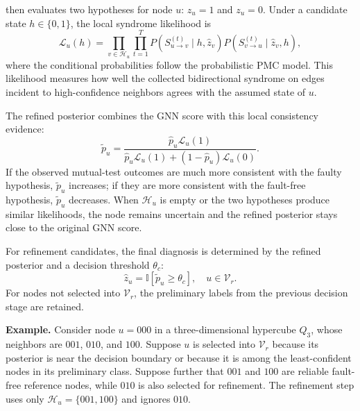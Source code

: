 \tool then evaluates two hypotheses for node $u$: $z_u=1$ and $z_u=0$. Under a candidate state $h\in\{0,1\}$, the local syndrome likelihood is
\begin{equation*}
\mathcal{L}_u(h)=
\prod_{v\in\mathcal{H}_u}\prod_{t=1}^{T}
P(S_{u\rightarrow v}^{(t)}\mid h,\hat{z}_v)
P(S_{v\rightarrow u}^{(t)}\mid \hat{z}_v,h),
\end{equation*}
where the conditional probabilities follow the probabilistic PMC model. This likelihood measures how well the collected bidirectional syndrome on edges incident to high-confidence neighbors agrees with the assumed state of $u$.

The refined posterior combines the GNN score with this local consistency evidence:
\begin{equation*}
\tilde{p}_u=
\frac{\hat{p}_u\mathcal{L}_u(1)}
{\hat{p}_u\mathcal{L}_u(1)+(1-\hat{p}_u)\mathcal{L}_u(0)}.
\end{equation*}
If the observed mutual-test outcomes are much more consistent with the faulty hypothesis, $\tilde{p}_u$ increases; if they are more consistent with the fault-free hypothesis, $\tilde{p}_u$ decreases. When $\mathcal{H}_u$ is empty or the two hypotheses produce similar likelihoods, the node remains uncertain and the refined posterior stays close to the original GNN score.

For refinement candidates, the final diagnosis is determined by the refined posterior and a decision threshold $\theta_c$:
\begin{equation*}
\hat{z}_u=\mathbb{I}[\tilde{p}_u\ge \theta_c],\quad u\in\mathcal{V}_{r}.
\end{equation*}
For nodes not selected into $\mathcal{V}_{r}$, the preliminary labels from the previous decision stage are retained.

\noindent\textbf{Example.}
Consider node $u=000$ in a three-dimensional hypercube $Q_3$, whose neighbors are $001$, $010$, and $100$. Suppose $u$ is selected into $\mathcal{V}_{r}$ because its posterior is near the decision boundary or because it is among the least-confident nodes in its preliminary class. Suppose further that $001$ and $100$ are reliable fault-free reference nodes, while $010$ is also selected for refinement. The refinement step uses only $\mathcal{H}_u=\{001,100\}$ and ignores $010$.

